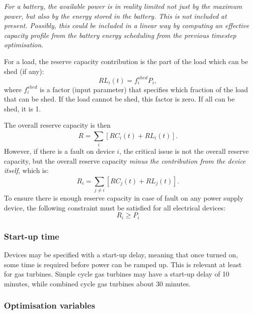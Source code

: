 \documentclass[12pt]{article}
\begin{document}
\textit{For a battery, the available power is in reality limited not just by the maximum power, but also by the energy stored in the battery. This is not included at present. Possibly, this could be included in a linear way by computing an effective capacity profile from the battery energy scheduling from the previous timestep optimisation}.

For a load, the reserve capacity contribution is the part of the load which can be shed (if any):
\begin{equation}
	RL_{i} \left( t \right) = f_{i}^{shed}P_{i}, 
\end{equation}
where  \( f_{i}^{shed} \)  is a factor (input parameter) that specifies which fraction of the load that can be shed. 
If the load cannot be shed, this factor is zero. If all can be shed, it is 1.


The overall reserve capacity is then
\begin{equation}
	R=  \sum _{i}^{} \left[ RC_{i} \left( t \right) +RL_{i} \left( t \right)  \right] . 
\end{equation}
However, if there is a fault on device  $i$, the critical issue is not the overall reserve capacity, but the overall reserve capacity \emph{minus the contribution from the device itself}, which is:
\begin{equation}
 	R_{i}=  \sum _{j \neq i}^{} \left[ RC_{j}(t) +RL_{j}(t)  \right] . 
\end{equation}
To ensure there is enough reserve capacity in case of fault on any power supply device,  the following constraint must be satisfied for all electrical devices:
 \begin{equation}
 	R_{i} \geq P_{i} 
 \end{equation}
 
 
\subsubsection{Start-up time}

Devices may be specified with a start-up delay, meaning that once turned on, some time is required before power can be ramped up. This is relevant at least for gas turbines. 
Simple cycle gas turbines may have a start-up delay of 10 minutes, while combined cycle gas turbines about 30 minutes.



\subsubsection{Optimisation variables}
\end{document}
